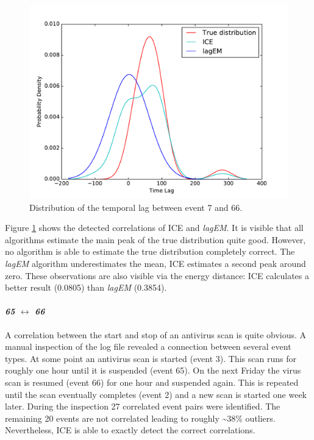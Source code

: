 \documentclass[conference]{IEEEtran}
\theoremstyle{examplestyle}
\begin{document}
\begin{figure}[!htb]
	\centering
	\includegraphics[scale=0.4]{images/symantec/7-66.pdf}
	\caption{Distribution of the temporal lag between event 7 and 66.}
	\label{fig:7-66}
\end{figure}

Figure \ref{fig:7-66} shows the detected correlations of \ac{ICE} and \textit{lagEM}. It is visible that all algorithms estimate the main peak of the true distribution quite good. However, no algorithm is able to estimate the true distribution completely correct. The \textit{lagEM} algorithm underestimates the mean, \ac{ICE} estimates a second peak around zero. These observations are also visible via the energy distance: \ac{ICE} calculates a better result (0.0805) than \textit{lagEM} (0.3854).




\paragraph{\textit{65} \(\leftrightarrow\) \textit{66}} A correlation between the start and stop of an antivirus scan is quite obvious. A manual inspection of the log file revealed a connection between several event types. At some point an antivirus scan is started (event 3). This scan runs for roughly one hour until it is suspended (event 65). On the next Friday the virus scan is resumed (event 66) for one hour and suspended again. This is repeated until the scan eventually completes (event 2) and a new scan is started one week later. During the inspection 27 correlated event pairs were identified. The remaining 20 events are not correlated leading to roughly \textasciitilde 38\% outliers. Nevertheless, \ac{ICE} is able to exactly detect the correct correlations.
\end{document}
